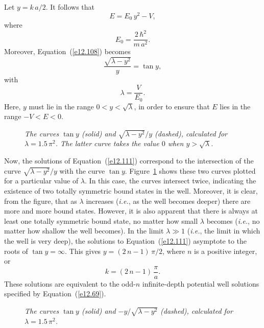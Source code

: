 Let $y=k\,a/2$. It follows that 
\begin{equation}
E = E_0\,y^2 - V,
\end{equation}
where
\begin{equation}
E_0 = \frac{2\,\hbar^2}{m\,a^2}.
\end{equation}
Moreover, Equation~(\ref{e12.108}) becomes
\begin{equation}\label{e12.111}
\frac{\sqrt{\lambda-y^2}}{y} = \tan y,
\end{equation}
with
\begin{equation}
\lambda = \frac{V}{E_0}.
\end{equation}
Here, $y$ must lie in the range $0<y<\sqrt{\lambda}$, in order to ensure that $E$
lies in the range $-V<E<0$.

\begin{figure}
\epsfysize=3in
\centerline{}
\caption{\em The curves $\tan y$ (solid) and $\sqrt{\lambda - y^2}/y$ (dashed), calculated for $\lambda = 1.5\,\pi^2$. The latter curve takes the
value $0$ when $y>\sqrt{\lambda}$. }\label{f12.6}   
\end{figure}

Now, the solutions of Equation~(\ref{e12.111}) correspond to the
intersection of the curve $\sqrt{\lambda - y^2}/y$ with the curve
$\tan y$. Figure~\ref{f12.6} shows these two curves plotted for
a particular value of $\lambda$. In this case, the curves intersect
twice, indicating the existence of two totally symmetric bound states in the well.
Moreover, it is clear, from the figure, that as $\lambda$ increases ({\em i.e.}, as the well becomes
deeper) there are more and more bound states. However, it is also apparent  that there is
always at least one totally symmetric bound state, no matter how small $\lambda$
becomes ({\em i.e.}, no matter how shallow the well becomes). In the limit $\lambda\gg 1$
({\em i.e.}, the limit in which the well is very deep), the
solutions to Equation~(\ref{e12.111}) asymptote to the roots of $\tan y =\infty$.
This gives $y = (2\,n-1)\,\pi/2$, where $n$ is a positive integer, or
\begin{equation}
k = (2\,n-1)\,\frac{\pi}{a}.
\end{equation}
These solutions are equivalent to the odd-$n$ infinite-depth potential well solutions 
specified by Equation~(\ref{e12.69}).

\begin{figure}
\epsfysize=3in
\centerline{}
\caption{\em The curves $\tan y$ (solid) and $-y/\sqrt{\lambda - y^2}$ (dashed), calculated for $\lambda = 1.5\,\pi^2$. }\label{f12.7}   
\end{figure}


